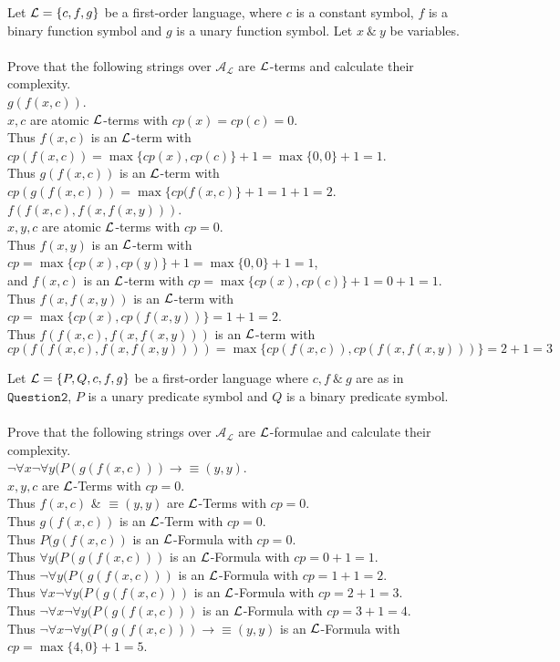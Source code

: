 \documentclass[11pt,a4paper]{article}
\begin{document}
\question
Let $\mathcal{L}=\{c,f,g\}$ be a first-order language, where $c$ is a constant symbol, $f$ is a binary function symbol and $g$ is a unary function symbol. Let $x\ \&\ y$ be variables.\\
\\
Prove that the following strings over $\mathcal{A_L}$ are $\mathcal{L}$-terms and calculate their complexity.\\

\qpartnb $g(f(x,c))$.\\

\apart
$x,c$ are atomic $\mathcal{L}$-terms with $cp(x)=cp(c)=0$.\\
Thus $f(x,c)$ is an $\mathcal{L}$-term with $cp(f(x,c))=\max\{cp(x),cp(c)\}+1=\max\{0,0\}+1=1$.\\
Thus $g(f(x,c))$ is an $\mathcal{L}$-term with $cp(g(f(x,c)))=\max\{cp(f(x,c)\}+1=1+1=2$.\\

\qpartnb $f(f(x,c),f(x,f(x,y)))$.\\

\apart
$x,y,c$ are atomic $\mathcal{L}$-terms with $cp=0$.\\
Thus $f(x,y)$ is an $\mathcal{L}$-term with $cp=\max\{cp(x),cp(y)\}+1=\max\{0,0\}+1=1$,\\
and $f(x,c)$ is an $\mathcal{L}$-term with $cp=\max\{cp(x),cp(c)\}+1=0+1=1$.\\
Thus $f(x,f(x,y))$ is an $\mathcal{L}$-term with $cp=\max\{cp(x),cp(f(x,y))\}=1+1=2$.\\
Thus $f(f(x,c),f(x,f(x,y)))$ is an $\mathcal{L}$-term with
$$cp(f(f(x,c),f(x,f(x,y))))=\max\{cp(f(x,c)),cp(f(x,f(x,y)))\}=2+1=3$$

\question
Let $\mathcal{L}=\{P,Q,c,f,g\}$ be a first-order language where $c,f\ \&\ g$ are as in $\mathtt{Question 2}$, $P$ is a unary predicate symbol and $Q$ is a binary predicate symbol.\\
\\
Prove that the following strings over $\mathcal{A_L}$ are $\mathcal{L}$-formulae and calculate their complexity.\\

\qpartnb $\neg\forall x\neg\forall y(P(g(f(x,c)))\longrightarrow\equiv(y,y)$.\\

\apart
$x,y,c$ are $\mathcal{L}$-Terms with $cp=0$.\\
Thus $f(x,c)$ \& $\equiv(y,y)$ are $\mathcal{L}$-Terms with $cp=0$.\\
Thus $g(f(x,c))$ is an $\mathcal{L}$-Term with $cp=0$.\\
Thus $P(g(f(x,c))$ is an $\mathcal{L}$-Formula with $cp=0$.\\
Thus $\forall y(P(g(f(x,c)))$ is an $\mathcal{L}$-Formula with $cp=0+1=1$.\\
Thus $\neg\forall y(P(g(f(x,c)))$ is an $\mathcal{L}$-Formula with $cp=1+1=2$.\\
Thus $\forall x\neg\forall y(P(g(f(x,c)))$ is an $\mathcal{L}$-Formula with $cp=2+1=3$.\\
Thus $\neg\forall x\neg\forall y(P(g(f(x,c)))$ is an $\mathcal{L}$-Formula with $cp=3+1=4$.\\
Thus $\neg\forall x\neg\forall y(P(g(f(x,c)))\longrightarrow\equiv(y,y)$ is an $\mathcal{L}$-Formula with $cp=\max\{4,0\}+1=5$.\\
\end{document}
